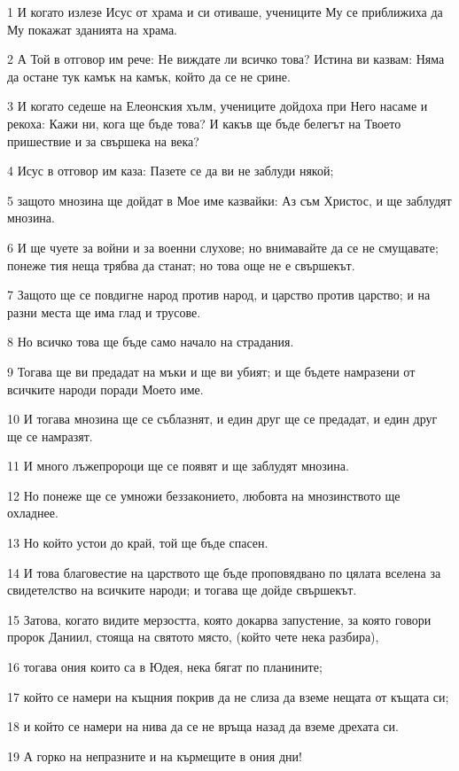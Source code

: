 \par 1 И когато излезе Исус от храма и си отиваше, учениците Му се приближиха да Му покажат зданията на храма.
\par 2 А Той в отговор им рече: Не виждате ли всичко това? Истина ви казвам: Няма да остане тук камък на камък, който да се не срине.
\par 3 И когато седеше на Елеонския хълм, учениците дойдоха при Него насаме и рекоха: Кажи ни, кога ще бъде това? И какъв ще бъде белегът на Твоето пришествие и за свършека на века?
\par 4 Исус в отговор им каза: Пазете се да ви не заблуди някой;
\par 5 защото мнозина ще дойдат в Мое име казвайки: Аз съм Христос, и ще заблудят мнозина.
\par 6 И ще чуете за войни и за военни слухове; но внимавайте да се не смущавате; понеже тия неща трябва да станат; но това още не е свършекът.
\par 7 Защото ще се повдигне народ против народ, и царство против царство; и на разни места ще има глад и трусове.
\par 8 Но всичко това ще бъде само начало на страдания.
\par 9 Тогава ще ви предадат на мъки и ще ви убият; и ще бъдете намразени от всичките народи поради Моето име.
\par 10 И тогава мнозина ще се съблазнят, и един друг ще се предадат, и един друг ще се намразят.
\par 11 И много лъжепророци ще се появят и ще заблудят мнозина.
\par 12 Но понеже ще се умножи беззаконието, любовта на мнозинството ще охладнее.
\par 13 Но който устои до край, той ще бъде спасен.
\par 14 И това благовестие на царството ще бъде проповядвано по цялата вселена за свидетелство на всичките народи; и тогава ще дойде свършекът.
\par 15 Затова, когато видите мерзостта, която докарва запустение, за която говори пророк Даниил, стояща на святото място, (който чете нека разбира),
\par 16 тогава ония които са в Юдея, нека бягат по планините;
\par 17 който се намери на къщния покрив да не слиза да вземе нещата от къщата си;
\par 18 и който се намери на нива да се не връща назад да вземе дрехата си.
\par 19 А горко на непразните и на кърмещите в ония дни!
